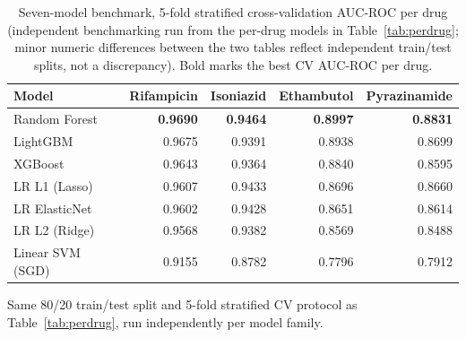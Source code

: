 \begin{table}[t]
\centering
\caption{Seven-model benchmark, 5-fold stratified cross-validation AUC-ROC per drug (independent benchmarking run from the per-drug models in Table~\ref{tab:perdrug}; minor numeric differences between the two tables reflect independent train/test splits, not a discrepancy). Bold marks the best CV AUC-ROC per drug.}
\label{tab:modelcomparison}
\small
\begin{tabular}{lrrrr}
\toprule
Model & Rifampicin & Isoniazid & Ethambutol & Pyrazinamide \\
\midrule
Random Forest        & \textbf{0.9690} & \textbf{0.9464} & \textbf{0.8997} & \textbf{0.8831} \\
LightGBM              & 0.9675 & 0.9391 & 0.8938 & 0.8699 \\
XGBoost                & 0.9643 & 0.9364 & 0.8840 & 0.8595 \\
LR L1 (Lasso)          & 0.9607 & 0.9433 & 0.8696 & 0.8660 \\
LR ElasticNet          & 0.9602 & 0.9428 & 0.8651 & 0.8614 \\
LR L2 (Ridge)          & 0.9568 & 0.9382 & 0.8569 & 0.8488 \\
Linear SVM (SGD)       & 0.9155 & 0.8782 & 0.7796 & 0.7912 \\
\bottomrule
\end{tabular}

\vspace{4pt}
\footnotesize
Same 80/20 train/test split and 5-fold stratified CV protocol as Table~\ref{tab:perdrug}, run independently per model family.
\end{table}

